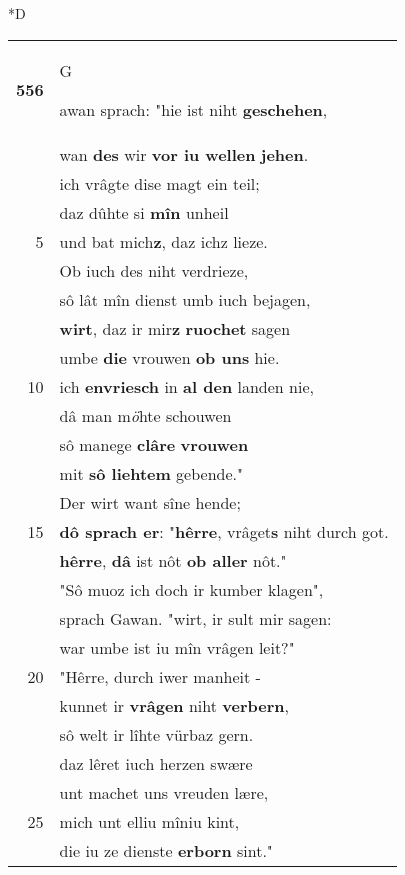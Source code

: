 \documentclass[8pt,a4paper,notitlepage]{article}
\begin{document}
\begin{table}[ht]
\begin{minipage}[t]{0.5\linewidth}
\small
\begin{center}*D
\end{center}
\begin{tabular}{rl}
\textbf{556} & \begin{large}G\end{large}awan sprach: "hie ist niht \textbf{geschehen},\\ 
 & wan \textbf{des} wir \textbf{vor iu wellen} \textbf{jehen}.\\ 
 & ich vrâgte dise magt ein teil;\\ 
 & daz dûhte si \textbf{mîn} unheil\\ 
5 & und bat mich\textbf{z}, daz ichz lieze.\\ 
 & Ob iuch des niht verdrieze,\\ 
 & sô lât mîn dienst umb iuch bejagen,\\ 
 & \textbf{wirt}, daz ir mir\textbf{z} \textbf{ruochet} sagen\\ 
 & umbe \textbf{die} vrouwen \textbf{ob uns} hie.\\ 
10 & ich \textbf{en}\textbf{vriesch} in \textbf{al den} landen nie,\\ 
 & dâ man m\textit{ö}hte schouwen\\ 
 & sô manege \textbf{clâre} \textbf{vrouwen}\\ 
 & mit \textbf{sô liehtem} gebende."\\ 
 & Der wirt want sîne hende;\\ 
15 & \textbf{dô sprach er}: "\textbf{hêrre}, vrâget\textbf{s} niht durch got.\\ 
 & \textbf{hêrre}, \textbf{dâ} ist nôt \textbf{ob aller} nôt."\\ 
 & "Sô muoz ich doch ir kumber klagen",\\ 
 & sprach Gawan. "wirt, ir sult mir sagen:\\ 
 & war umbe ist iu mîn vrâgen leit?"\\ 
20 & "Hêrre, durch iwer manheit -\\ 
 & kunnet ir \textbf{vrâgen} niht \textbf{verbern},\\ 
 & sô welt ir lîhte vürbaz gern.\\ 
 & daz lêret iuch herzen swære\\ 
 & unt machet uns vreuden lære,\\ 
25 & mich unt elliu mîniu kint,\\ 
 & die iu ze dienste \textbf{erborn} sint."\\ 

\end{tabular}
\end{minipage}
\end{table}
\end{document}
